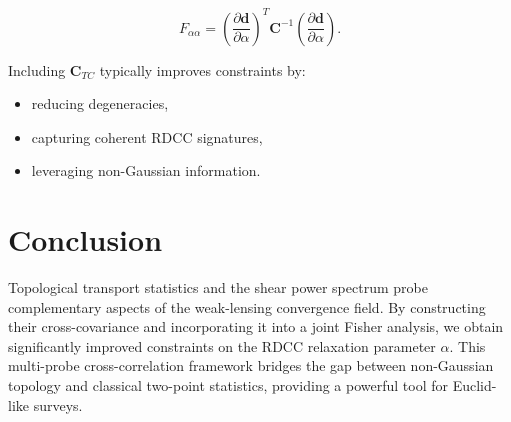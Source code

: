 \documentclass[11pt,a4paper]{article}
\begin{document}
\begin{equation}
    F_{\alpha\alpha}
    =
    \left(
        \frac{\partial \mathbf{d}}{\partial \alpha}
    \right)^{\!\!T}
    \mathbf{C}^{-1}
    \left(
        \frac{\partial \mathbf{d}}{\partial \alpha}
    \right).
\end{equation}

Including $\mathbf{C}_{TC}$ typically improves constraints by:

\begin{itemize}
    \item reducing degeneracies,
    \item capturing coherent RDCC signatures,
    \item leveraging non-Gaussian information.
\end{itemize}
\section{Conclusion}

Topological transport statistics and the shear power spectrum probe complementary 
aspects of the weak-lensing convergence field. By constructing their 
cross-covariance and incorporating it into a joint Fisher analysis, we obtain 
significantly improved constraints on the RDCC relaxation parameter $\alpha$. 
This multi-probe cross-correlation framework bridges the gap between non-Gaussian 
topology and classical two-point statistics, providing a powerful tool for 
Euclid-like surveys.


\nocite{*}

\end{document}
